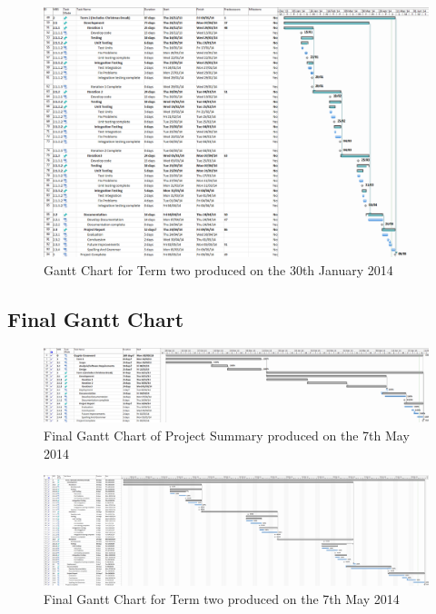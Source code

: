 \begin{landscape}
\begin{figure}[H]
  \centering
  \includegraphics[width=\linewidth]{images/gant_chart_interim_term2.png}
  \caption{Gantt Chart for Term two produced on the 30th January 2014}
  \label{fig:ganttinterimterm2}
\end{figure}



\subsection{Final Gantt Chart}

\begin{figure}[H]
  \centering
  \includegraphics[width=\linewidth]{images/gant_chart_final_overview.png}
  \caption{Final Gantt Chart of Project Summary produced on the 7th May 2014}
  \label{fig:ganttfinaloverview}
\end{figure}

\begin{figure}[H]
  \centering
  \includegraphics[width=\linewidth]{images/gant_chart_final_term2.png}
  \caption{Final Gantt Chart for Term two produced on the 7th May 2014}
  \label{fig:ganttfinalterm2}
\end{figure}

\end{landscape}

